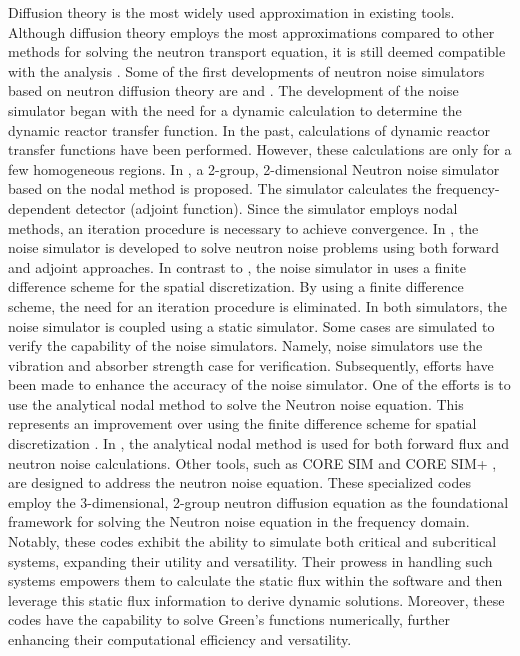 Diffusion theory is the most widely used approximation in existing tools. Although diffusion theory employs the most approximations compared to other methods for solving the neutron transport equation, it is still deemed compatible with the analysis \cite{duderstadtNuclearReactorAnalysis1977, demaziereNumericalToolsApplied2009}. Some of the first developments of neutron noise simulators based on neutron diffusion theory are \cite{kherichaDevelopmentTwoenergyGroup2001} and \cite{demaziereDevelopment2D2group2004}. The development of the noise simulator began with the need for a dynamic calculation to determine the dynamic reactor transfer function. In the past, calculations of dynamic reactor transfer functions have been performed. However, these calculations are only for a few homogeneous regions. In \cite{kherichaDevelopmentTwoenergyGroup2001}, a 2-group, 2-dimensional Neutron noise simulator based on the nodal method is proposed. The simulator calculates the frequency-dependent detector (adjoint function). Since the simulator employs nodal methods, an iteration procedure is necessary to achieve convergence. In \cite{demaziereDevelopment2D2group2004}, the noise simulator is developed to solve neutron noise problems using both forward and adjoint approaches. In contrast to \cite{kherichaDevelopmentTwoenergyGroup2001}, the noise simulator in \cite{demaziereDevelopment2D2group2004} uses a finite difference scheme for the spatial discretization. By using a finite difference scheme, the need for an iteration procedure is eliminated. In both simulators, the noise simulator is coupled using a static simulator. Some cases are simulated to verify the capability of the noise simulators. Namely, noise simulators use the vibration and absorber strength case for verification. Subsequently, efforts have been made to enhance the accuracy of the noise simulator. One of the efforts is to use the analytical nodal method \cite{smithAnalyticNodalMethod1979} to solve the Neutron noise equation. This represents an improvement over using the finite difference scheme for spatial discretization \cite{larssonNeutronNoiseCalculations2011}. In \cite{larssonNeutronNoiseCalculations2011}, the analytical nodal method is used for both forward flux and neutron noise calculations. Other tools, such as CORE SIM \cite{demaziereCORESIMMultipurpose2011, dykinDEMONSTRATIONCOUPLEDCORE2014} and CORE SIM+ \cite{mylonakisCORESIMFlexible2021, mylonakisNeutronNoiseModelling2019, mylonakisNumericalSolutionTwoenergygroup2020}, are designed to address the neutron noise equation. These specialized codes employ the 3-dimensional, 2-group neutron diffusion equation as the foundational framework for solving the Neutron noise equation in the frequency domain. Notably, these codes exhibit the ability to simulate both critical and subcritical systems, expanding their utility and versatility. Their prowess in handling such systems empowers them to calculate the static flux within the software and then leverage this static flux information to derive dynamic solutions. Moreover, these codes have the capability to solve Green's functions numerically, further enhancing their computational efficiency and versatility.

